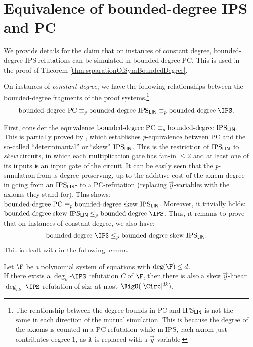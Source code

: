 \documentclass[a4paper,UKenglish,cleveref, autoref, thm-restate]{lipics-v2021}
\newcommand{\IPSlin}{\text{\upshape IPS}_{\mathsf{LIN}}}
\begin{document}
\section{Equivalence of bounded-degree IPS and PC}
We provide details for the claim that on instances of constant degree, bounded-degree IPS refutations can be simulated in bounded-degree PC. This is used in the proof of Theorem \ref{thm:separationOfSymBoundedDegree}.
\begin{theorem}
	\label{thm:simulationsOfAlgebraicSystemsInIPSconstantDegree}
	On instances of \emph{constant degree}, we have the following relationships between the bounded-degree fragments of the proof systems.\footnote{The relationship between the degree bounds in PC and $\IPSlin$ is not the same in each direction of the mutual simulation. This is because the degree of the axioms is counted in a PC refutation while in IPS, each axiom just contributes degree $1$, as it is replaced with a $\vec y$-variable.}    
	\[
	\text{bounded-degree }\mathrm{PC} \equiv_p \text{bounded-degree }\IPSlin \equiv_p \text{bounded-degree } \IPS.
	\]
\end{theorem}
First, consider the equivalence $\text{bounded-degree }\mathrm{PC} \equiv_p \text{bounded-degree }\IPSlin$. 
This is partially proved by \cite[Proposition 3.4]{IPS}, which establishes $p$-equivalence between PC and the so-called ``determinantal'' or ``skew'' $\IPSlin$. This is the restriction of $\IPSlin$ to \emph{skew} circuits, in which each multiplication gate has fan-in $\leq 2$ and at least one of its inputs is an input gate of the circuit.
It can be easily seen that the $p$-simulation from \cite[Proposition 3.4]{IPS} is degree-preserving, up to the additive cost of the axiom degree in going from an $\IPSlin$- to a PC-refutation (replacing $\vec y$-variables with the axioms they stand for). This shows: $\text{bounded-degree }\mathrm{PC} \equiv_p \text{bounded-degree skew  }\IPSlin$. Moreover, it trivially holds: $\text{bounded-degree skew }\IPSlin \leq_p \text{bounded-degree } \IPS$. 
Thus, it remains to prove that on instances of constant degree, we also have: 
\[
\text{bounded-degree } \IPS \leq_p \text{bounded-degree skew }\IPSlin.
\]
This is dealt with in the following lemma.
\begin{lemma}
	\label{lem:constantDegreeAllowsSkewisation}
	Let $\F$ be a polynomial system of equations with $\deg(\F) \leq d$.\\ 
	If there exists a $\deg_k$-$\IPS$ refutation $C$ of $\F$, then there is also a skew $\vec y$-linear $\deg_{dk}$-$\IPS$ refutation of size at most $\BigO(|\Circ|^{dk})$.
\end{lemma}
\end{document}
